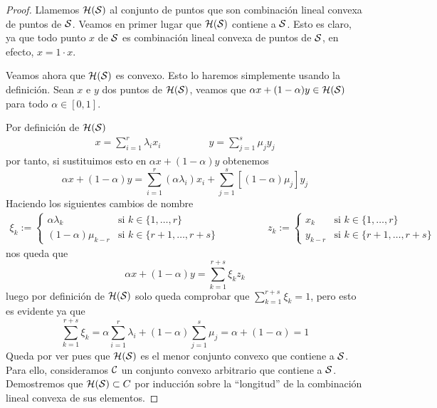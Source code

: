 \begin{proof}
	Llamemos $\mathcal{H}(\mathcal{S})$ al conjunto de puntos que son combinación lineal convexa de puntos de $\mathcal{S}$. Veamos en primer lugar que $\mathcal{H}(\mathcal{S})$ contiene a $\mathcal{S}$. Esto es claro, ya que todo punto $x$ de $\mathcal{S}$ es combinación lineal convexa de puntos de $\mathcal{S}$, en efecto, $x=1\cdot x$.
	
	Veamos ahora que $\mathcal{H}(\mathcal{S})$ es convexo. Esto lo haremos simplemente usando la definición. Sean $x$ e $y$ dos puntos de $\mathcal{H}(\mathcal{S})$, veamos que $\alpha x + (1-\alpha)y\in \mathcal{H}(\mathcal{S})$ para todo $\alpha\in[0,1]$.
	
	Por definición de $\mathcal{H}(\mathcal{S})$
	\begin{equation*}
	\begin{array}{cc}
	x=\sum_{i=1}^{r}\lambda_ix_i \qquad&\qquad 
	y=\sum_{j=1}^{s}\mu_jy_j
	\end{array}
	\end{equation*}
	por tanto, si sustituimos esto en $\alpha x + (1-\alpha)y$ obtenemos
	\begin{equation*}
		\alpha x + (1-\alpha)y=\sum_{i=1}^{r}(\alpha\lambda_i)x_i+\sum_{j=1}^{s}[(1-\alpha)\mu_j]y_j
	\end{equation*}
	Haciendo los siguientes cambios de nombre
	\begin{equation*}
	\begin{array}{cc}
	\xi_k:=\begin{cases}
	\alpha\lambda_k & \text{si } k\in\{1,\dots,r\}\\
	(1-\alpha)\mu_{k-r} & \text{si } k\in\{r+1,\dots,r+s\}
	\end{cases}
	\qquad
	&
	\qquad
	z_k:=\begin{cases}
	x_k & \text{si } k\in\{1,\dots,r\}\\
	y_{k-r} & \text{si } k\in\{r+1,\dots,r+s\}
	\end{cases}
	\end{array}
	\end{equation*}
	nos queda que
	\begin{equation*}
		\alpha x + (1-\alpha)y=\sum_{k=1}^{r+s}\xi_kz_k
	\end{equation*}
	luego por definición de $\mathcal{H}(\mathcal{S})$ solo queda comprobar que $\sum_{k=1}^{r+s}\xi_k=1$, pero esto es evidente ya que
	\begin{equation*}
		\sum_{k=1}^{r+s}\xi_k=\alpha\sum_{i=1}^r\lambda_i+(1-\alpha)\sum_{j=1}^{s}\mu_j=\alpha+(1-\alpha)=1
	\end{equation*}
	Queda por ver pues que $\mathcal{H}(\mathcal{S})$ es el menor conjunto convexo que contiene a $\mathcal{S}$. Para ello, consideramos $\mathcal{C}$ un conjunto convexo arbitrario que contiene a $\mathcal{S}$. Demostremos que $\mathcal{H}(\mathcal{S})\subset C$ por inducción sobre la ``longitud'' de la combinación lineal convexa de sus elementos.
	

\end{proof}
